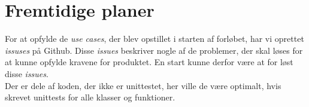 \documentclass[11pt]{article}
\begin{document}
\section{Fremtidige planer}
For at opfylde de \textit{use cases}, der blev opstillet i starten af forløbet, har vi oprettet \textit{issuses} på Github. Disse \textit{issues} beskriver nogle af de problemer, der skal løses for at kunne opfylde kravene for produktet. En start kunne derfor være at for løst disse \textit{issues}. \\
Der er dele af koden, der ikke er unittestet, her ville de være optimalt, hvis skrevet unittests for alle klasser og funktioner.   
\end{document}
